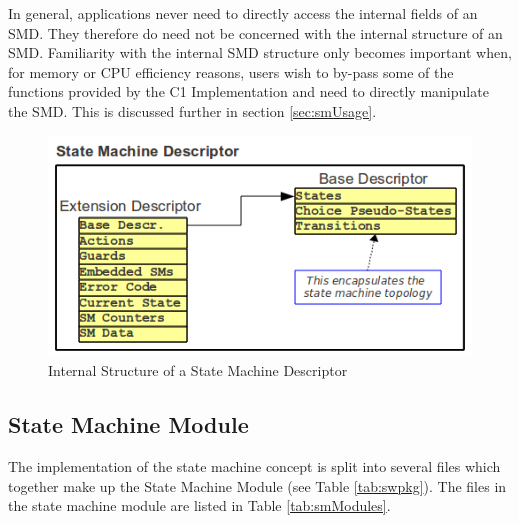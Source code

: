 \documentclass[a4paper,10pt]{article}
\begin{document}
In general, applications never need to directly access the internal fields of an SMD. 
They therefore do need not be concerned with the internal structure of an SMD. Familiarity with the internal SMD structure only becomes important when, for memory or CPU efficiency reasons, users wish to by-pass some of the functions provided by the C1 Implementation and need to directly manipulate the SMD. This is discussed further in section \ref{sec:smUsage}.

\begin{figure}[ht]
 \centering
 \includegraphics[scale=0.6,keepaspectratio=true]{../images/SMD.png}
 \caption{Internal Structure of a State Machine Descriptor}
 \label{fig:SMD}
\end{figure}

\subsection{State Machine Module}
The implementation of the state machine concept is split into several files which together
make up the State Machine Module (see Table \ref{tab:swpkg}). The files in the state machine module are listed 
in Table \ref{tab:smModules}.
\end{document}
